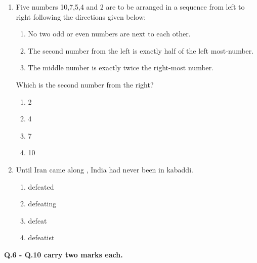 \documentclass[12pt]{article}
\begin{document}
\begin{enumerate}[label = Q.\arabic*]
\begin{multicols}{4}
\begin{enumerate}[label=(\Alph*)]
				\item 72.8
			\end{enumerate}
		\end{multicols}
	\item Five numbers 10,7,5,4 and 2 are to be arranged in a sequence from left to right following the directions given below:
		\begin{enumerate}[label=\arabic*.]
			\item No two odd or even numbers are next to each other.
			\item The second number from the left is exactly half of the left most-number.
			\item The middle number is exactly twice the right-most number.
		\end{enumerate}
		Which is the second number from the right?
		\begin{multicols}{4}
			\begin{enumerate}[label=(\Alph*)]
				\item 2 \item 4 \item 7 \item 10
			\end{enumerate}
		\end{multicols}
	\item Until Iran came along , India had never been \underline{\hspace{2cm}} in kabaddi.
		\begin{multicols}{4}
			\begin{enumerate}[label=(\Alph*)]
				\item defeated \item defeating \item defeat \item defeatist
			\end{enumerate}
		\end{multicols}
		\newpage
\end{enumerate}
\noindent\textbf{Q.6 - Q.10 carry two marks each.}
\end{document}
